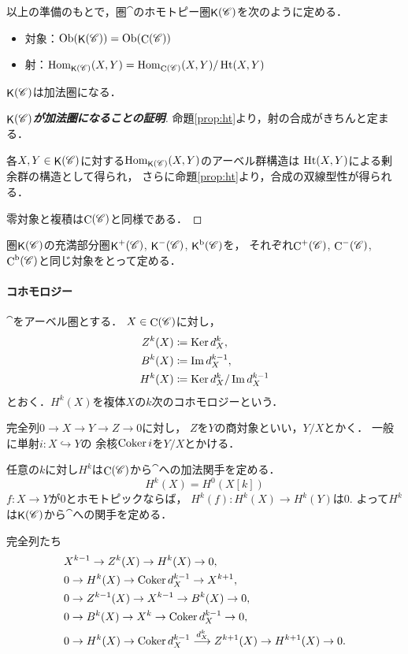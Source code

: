 以上の準備のもとで，圏$\cat$のホモトピー圏$\KCat$を次のように定める．
\begin{itemize}
    \item 対象：$\Ob(\KCat)=\Ob(\CCat)$
    \item 射：$\Hom_{\KCat}(X,Y)=\Hom_{\CCat}(X,Y)/\Ht(X,Y)$
\end{itemize}
$\KCat$は加法圏になる．
\begin{proof}[\textbf{$\KCat$が加法圏になることの証明}]
    命題\ref{prop:ht}より，射の合成がきちんと定まる．

    各$X,Y\in\KCat$に対する$\Hom_{\KCat}(X,Y)$のアーベル群構造は
    $\Ht(X,Y)$による剰余群の構造として得られ，
    さらに命題\ref{prop:ht}より，合成の双線型性が得られる．

    零対象と複積は$\CCat$と同様である．
\end{proof}

圏$\KCat$の充満部分圏$\Komp^+(\cat)$, 
$\Komp^-(\cat)$, $\Komp^\mathrm{b}(\cat)$を，
それぞれ$\Comp^+(\cat)$, 
$\Comp^-(\cat)$, $\Comp^\mathrm{b}(\cat)$と同じ対象をとって定める．

\paragraph*{コホモロジー}
$\cat$をアーベル圏とする．
$X\in\CCat$に対し，
\begin{align*}
    Z^k(X)&\coloneqq \Ker d_X^k,\\
    B^k(X)&\coloneqq \im d_X^{k-1},\\
    H^k(X)&\coloneqq \Ker d_X^k/\im d_X^{k-1}
\end{align*}
とおく．$H^k(X)$を複体$X$の$k$次のコホモロジーという．

\begin{Attention*}
    完全列$0\to X\rightarrow Y\rightarrow Z\to0$に対し，
    $Z$を$Y$の商対象といい，$Y/X$とかく．
    一般に単射$i\colon X\hookrightarrow Y$の
    余核$\Coker{i}$を$Y/X$とかける．
\end{Attention*}

任意の$k$に対し$H^k$は$\CCat$から$\cat$への加法関手を定める．
\begin{equation}
    H^k(X)=H^0(X[k])
\end{equation}
$f\colon X\to Y$が0とホモトピックならば，
$H^k(f)\colon H^k(X)\to H^k(Y)$は0. 
よって$H^k$は$\KCat$から$\cat$への関手を定める．

完全列たち
\begin{align*}
    &X^{k-1}\to Z^{k}(X)\to H^{k}(X)\to 0,\\
    &0\to H^{k}(X)\to \Coker{d_X^{k-1}}\to X^{k+1},\\
    &0\to Z^{k-1}(X)\to X^{k-1}\to B^{k}(X)\to 0,\\
    &0\to B^{k}(X)\to X^{k}\to \Coker{d_X^{k-1}}\to 0,\\
    &0\to H^{k}(X)\to \Coker{d_X^{k-1}}\overset{d_X^{k}}{\longrightarrow}Z^{k+1}(X)\to H^{k+1}(X)\to 0.
\end{align*}

